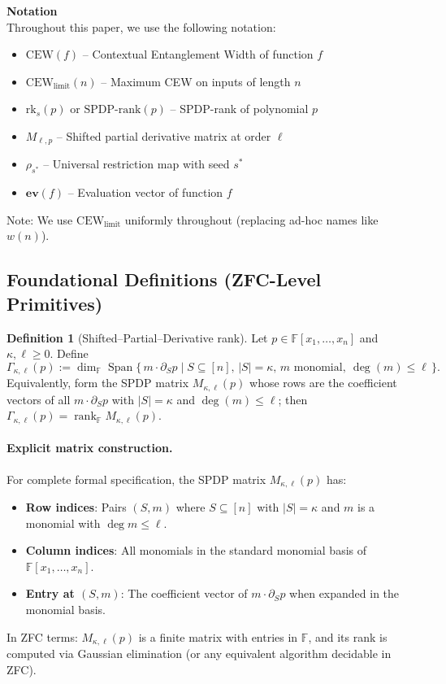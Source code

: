 \documentclass[12pt]{article}
\newcommand{\evvec}{\mathbf{ev}}  %
\theoremstyle{definition}
\newtheorem{definition}{Definition}
\theoremstyle{definition}
\theoremstyle{remark}
\theoremstyle{remark}
\begin{document}
\begin{mdframed}[backgroundcolor=gray!5,linecolor=gray!75,linewidth=1pt]
\textbf{Notation}\\[0.5em]
Throughout this paper, we use the following notation:
\begin{itemize}
\item $\mathrm{CEW}(f)$ -- Contextual Entanglement Width of function $f$
\item $\mathrm{CEW}_{\text{limit}}(n)$ -- Maximum CEW on inputs of length $n$
\item $\mathrm{rk}_s(p)$ or $\mathrm{SPDP\text{-}rank}(p)$ -- SPDP-rank of polynomial $p$
\item $M_{\ell,p}$ -- Shifted partial derivative matrix at order $\ell$
\item $\rho_{s^*}$ -- Universal restriction map with seed $s^*$
\item $\evvec(f)$ -- Evaluation vector of function $f$
\end{itemize}
Note: We use $\mathrm{CEW}_{\text{limit}}$ uniformly throughout (replacing ad-hoc names like $w(n)$).
\end{mdframed}

\subsection{Foundational Definitions (ZFC-Level Primitives)}
\label{sec:formal-definitions}

\begin{definition}[Shifted--Partial--Derivative rank]\label{def:SPDP}
Let $p\in\mathbb{F}[x_1,\dots,x_n]$ and $\kappa,\ell\ge 0$. Define
\[
\Gamma_{\kappa,\ell}(p)
:= \dim_\mathbb{F} \operatorname{Span}\{\, m\cdot \partial_S p \mid S\subseteq[n],\, |S|=\kappa,\,
m \text{ monomial},\ \deg(m)\le \ell \,\}.
\]
Equivalently, form the SPDP matrix $M_{\kappa,\ell}(p)$ whose rows are the coefficient vectors
of all $m\cdot\partial_S p$ with $|S|=\kappa$ and $\deg(m)\le \ell$; then
$\Gamma_{\kappa,\ell}(p)=\operatorname{rank}_\mathbb{F} M_{\kappa,\ell}(p)$.

\paragraph{Explicit matrix construction.}
For complete formal specification, the SPDP matrix $M_{\kappa,\ell}(p)$ has:
\begin{itemize}
\item \textbf{Row indices}: Pairs $(S, m)$ where $S \subseteq [n]$ with $|S| = \kappa$ and $m$ is a monomial with $\deg m \leq \ell$.
\item \textbf{Column indices}: All monomials in the standard monomial basis of $\mathbb{F}[x_1, \ldots, x_n]$.
\item \textbf{Entry at $(S,m)$}: The coefficient vector of $m \cdot \partial_S p$ when expanded in the monomial basis.
\end{itemize}
In ZFC terms: $M_{\kappa,\ell}(p)$ is a finite matrix with entries in $\mathbb{F}$, and its rank is computed via Gaussian elimination (or any equivalent algorithm decidable in ZFC).
\end{definition}
\end{document}
